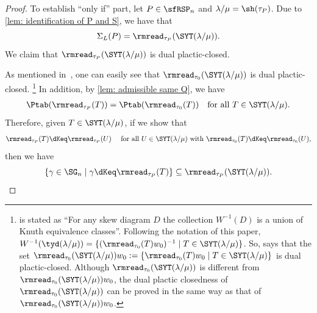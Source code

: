 \documentclass[12pt, reqno]{amsart}
\theoremstyle{definition}
\numberwithin{equation}{section} \numberwithin{figure}{section}
\numberwithin{table}{section}
\begin{document}
\begin{proof}
To establish ``only if'' part, let $P \in \sfRSP_n$ and $\lambda/\mu = \sh(\tau_P)$.
Due to \cref{lem: identification of P and S}, we have that 
\[\Sigma_L(P) = \rmread_{\tau_P}(\SYT(\lambda/\mu)).
\]
We claim that $\rmread_{\tau_P}(\SYT(\lambda/\mu))$ is dual plactic-closed.

As mentioned in~\cite[Property A]{85GR}, one can easily see that $\rmread_{\tau_0}(\SYT(\lambda/\mu))$ is dual plactic-closed.
\footnote{
\cite[Property A]{85GR} is stated as ``For any skew diagram $D$ the collection $W^{-1}(D)$ is a union of Knuth equivalence classes''.
Following the notation of this paper, $W^{-1}(\tyd(\lambda / \mu)) = \{(\rmread_{\tau_0}(T) w_0)^{-1} \mid T \in \SYT(\lambda/\mu)\}$.
So, \cite[Property A]{85GR} says that the set $\rmread_{\tau_0}(\SYT(\lambda/\mu)) w_0 := \{\rmread_{\tau_0}(T) w_0 \mid T \in \SYT(\lambda/\mu)\}$ is dual plactic-closed.
Although $\rmread_{\tau_0}(\SYT(\lambda/\mu))$ is different from $\rmread_{\tau_0}(\SYT(\lambda/\mu)) w_0$,  the dual plactic closedness of $\rmread_{\tau_0}(\SYT(\lambda/\mu))$ can be proved in the same way as that of $\rmread_{\tau_0}(\SYT(\lambda/\mu)) w_0$.
}
In addition, by \cref{lem: admissible same Q}, we have
\begin{align}\label{eq: admissible same Q}
\Ptab(\rmread_{\tau_P}(T)) = \Ptab(\rmread_{\tau_0}(T)) 
\quad \text{for all $T \in \SYT(\lambda/\mu)$}.
\end{align}
Therefore, given $T \in \SYT(\lambda/\mu)$, if we show that 
\[
\rmread_{\tau_P}(T) \dKeq \rmread_{\tau_P}(U)
\quad \text{
for all $U \in \SYT(\lambda/\mu)$ with $\rmread_{\tau_0}(T) \dKeq \rmread_{\tau_0}(U)$,}
\]
then we have
\[
\{\gamma \in \SG_n \mid \gamma \dKeq \rmread_{\tau_P}(T)\} \subseteq \rmread_{\tau_P}(\SYT(\lambda/\mu)).
\]


\end{proof}
\end{document}
